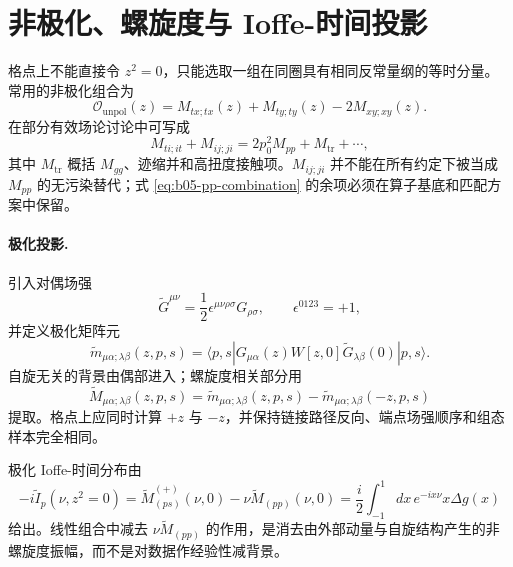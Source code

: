 \section{非极化、螺旋度与 Ioffe-时间投影}

格点上不能直接令 \(z^2=0\)，只能选取一组在同圈具有相同反常量纲的等时分量。常用的非极化组合为
\begin{equation}
  \mathcal O_{\mathrm{unpol}}(z)
  =M_{tx;tx}(z)+M_{ty;ty}(z)-2M_{xy;xy}(z).
  \label{eq:b05-unpol-combination}
\end{equation}
在部分有效场论讨论中可写成
\begin{equation}
  M_{ti;it}+M_{ij;ji}=2p_0^2M_{pp}+M_{\mathrm{tr}}+\cdots ,
  \label{eq:b05-pp-combination}
\end{equation}
其中 \(M_{\mathrm{tr}}\) 概括 \(M_{gg}\)、迹缩并和高扭度接触项。\(M_{ij;ji}\) 并不能在所有约定下被当成 \(M_{pp}\) 的无污染替代；式 \eqref{eq:b05-pp-combination} 的余项必须在算子基底和匹配方案中保留。

\paragraph{极化投影.}
引入对偶场强
\begin{equation}
  \widetilde G^{\mu\nu}=\frac12\epsilon^{\mu\nu\rho\sigma}G_{\rho\sigma},
  \qquad \epsilon^{0123}=+1,
  \label{eq:b05-dual-field}
\end{equation}
并定义极化矩阵元
\begin{equation}
  \widetilde m_{\mu\alpha;\lambda\beta}(z,p,s)
  =\langle p,s|G_{\mu\alpha}(z)W[z,0]\widetilde G_{\lambda\beta}(0)|p,s\rangle .
  \label{eq:b05-polarized-matrix}
\end{equation}
自旋无关的背景由偶部进入；螺旋度相关部分用
\begin{equation}
  \widetilde M_{\mu\alpha;\lambda\beta}(z,p,s)
  =\widetilde m_{\mu\alpha;\lambda\beta}(z,p,s)
  -\widetilde m_{\mu\alpha;\lambda\beta}(-z,p,s)
  \label{eq:b05-zodd}
\end{equation}
提取。格点上应同时计算 \(+z\) 与 \(-z\)，并保持链接路径反向、端点场强顺序和组态样本完全相同。

极化 Ioffe-时间分布由
\begin{equation}
  -i\widetilde I_p(\nu,z^2=0)
  =\widetilde M_{(ps)}^{(+)}(\nu,0)-\nu\widetilde M_{(pp)}(\nu,0)
  =\frac{i}{2}\int_{-1}^{1}dx\,e^{-ix\nu}x\Delta g(x)
  \label{eq:b05-polarized-ioffe}
\end{equation}
给出。线性组合中减去 \(\nu\widetilde M_{(pp)}\) 的作用，是消去由外部动量与自旋结构产生的非螺旋度振幅，而不是对数据作经验性减背景。

